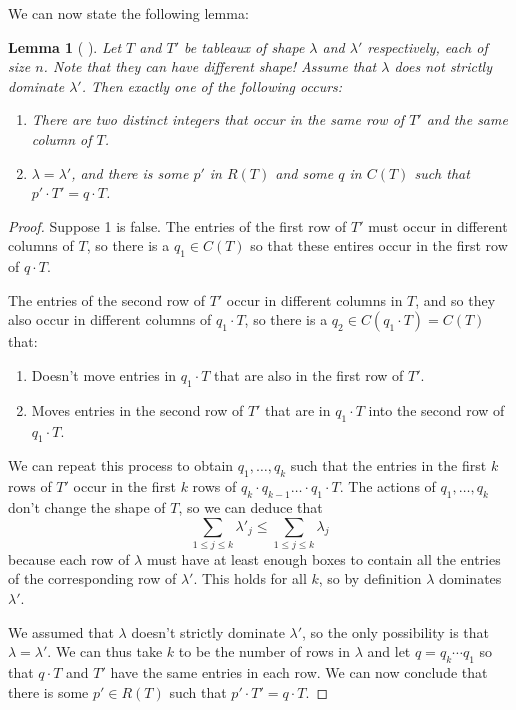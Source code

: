 \documentclass[12pt,twoside]{reedthesis}
\theoremstyle{plain}   %
\newtheorem{lemma}{Lemma}[section]
\theoremstyle{definition}
\theoremstyle{remark}
\numberwithin{equation}{section}
\begin{document}
   We can now state the following lemma:
   \begin{lemma}[ {\cite[Lemma 7.1]{fulton}} ] \label{lem1}
     Let $T$ and $T'$ be tableaux of shape $\lambda$ and $\lambda'$ respectively, each of size $n$. Note that they can have different shape!
     Assume that $\lambda$ does not strictly dominate $\lambda'$.
     Then exactly one of the following occurs:
     \begin{enumerate}
     \item There are two distinct integers that occur in the same row of $T'$ and the same column of $T$.
     \item $\lambda = \lambda'$, and there is some $p'$ in $R(T)$ and some $q$ in $C(T)$ such that $p' \cdot T' = q \cdot T$.
     \end{enumerate}
   \end{lemma}
   \begin{proof}
     Suppose 1 is false. The entries of the first row of $T'$ must occur in different columns of $T$,
     so there is a $q_1 \in C(T)$ so that these entires occur in the first row of $q \cdot T$.\par
     The entries of the second row of $T'$ occur in different columns in $T$, and so they also occur in different columns of $q_1 \cdot T$,
     so there is a $q_2 \in C(q_1 \cdot T) = C(T)$ that:
     \begin{enumerate}
     \item Doesn't move entries in $q_1 \cdot T$ that are also in the first row of $T'$.
     \item Moves entries in the second row of $T'$ that are in $q_1 \cdot T$
       into the second row of $q_1 \cdot T$.
     \end{enumerate}
     We can repeat this process to obtain $q_1, \dots, q_k$ such that the entries in the first $k$ rows of $T'$ occur in the first $k$ rows of
     $q_k \cdot q_{k-1} \dots \cdot q_1 \cdot T$. The actions of $q_1, \dots, q_k$ don't change the shape of $T$, so we can deduce that
     \[\sum_{1 \leq j \leq k} \lambda'_j \leq \sum_{1 \leq j \leq k} \lambda_j\]
     because each row of $\lambda$ must have at least enough boxes to contain all the entries of the corresponding row of $\lambda'$.
     This holds for all $k$, so by definition $\lambda$ dominates $\lambda'$. \par
     We assumed that $\lambda$ doesn't strictly dominate $\lambda'$, so the only possibility is that $\lambda = \lambda'$.
     We can thus take $k$ to be the number of rows in $\lambda$ and let $q = q_k \cdots q_1$ so that
     $q \cdot T$ and $T'$ have the same entries in each row.
     We can now conclude that there is some $p' \in R(T)$ such that $p' \cdot T' = q \cdot T$.
   \end{proof}
\end{document}
